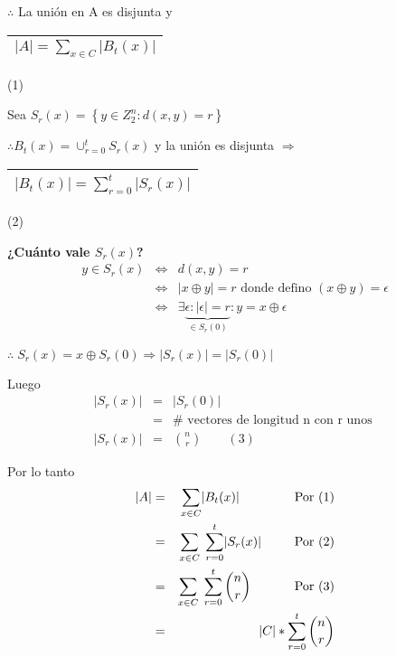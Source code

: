\documentclass[12pt,a4paper]{report}
\begin{document}
			\begin{center}
				$\therefore$ La unión en A es disjunta y \begin{tabular}{|c|} \hline $ \lvert A \rvert = \sum_{x \in C} \lvert B_{t}(x) \rvert $ \\ \hline \end{tabular} (1)
			\end{center}

			\vspace{3mm}
			\par Sea $S_{r}(x) = \left\lbrace y \in Z_{2}^{n} : d(x, y) = r \right\rbrace$

			\vspace{3mm}
			\par $\therefore B_{t}(x) = \cup_{r = 0}^{t}S_{r}(x)$ y la unión es disjunta $\Rightarrow$ \begin{tabular}{|c|} \hline $ \lvert B_{t}(x) \rvert = \sum_{r = 0}^{t}\lvert S_{r}(x) \rvert$ \\ \hline \end{tabular} (2)

			\vspace{3mm}
			\textbf{¿Cuánto vale $S_{r}(x)$?}
			\begin{eqnarray}
				\nonumber y \in S_{r}(x) & \Leftrightarrow & d(x, y) = r \\
				\nonumber & \Leftrightarrow & \lvert x \oplus y \rvert = r \text{ donde defino } (x \oplus y) = \epsilon \\
				\nonumber & \Leftrightarrow & \exists \underbrace{\epsilon : \lvert \epsilon\rvert = r}_{\in S_{r}(0)} : y = x \oplus \epsilon
			\end{eqnarray}
			\par $\therefore \; S_{r}(x) = x \oplus S_{r}(0) \Rightarrow \lvert S_{r}(x)\rvert = \lvert S_{r}(0)\rvert $

			\vspace{3mm}
			\par Luego
			\begin{eqnarray}
				\nonumber \lvert S_{r}(x)\rvert &=& \lvert S_{r}(0)\rvert \\
				\nonumber &=& \# \text{ vectores de longitud n con r unos } \\
				\nonumber \lvert S_{r}(x)\rvert &=& {n \choose r} \qquad (3)
			\end{eqnarray}

			\par Por lo tanto
			\begin{eqnarray}
				\nonumber \lvert A\rvert &=& \sum_{x \in C} \lvert B_{t}(x)\rvert \qquad \qquad \textup{ Por (1)} \\
				\nonumber &=& \sum_{x \in C} \; \sum_{r= 0}^{t} \lvert S_{r}(x) \rvert \; \qquad \textup{ Por (2)} \\
				\nonumber &=& \sum_{x \in C} \; \sum_{r = 0}^{t} {n \choose r} \qquad \; \; \; \;\textup{ Por (3)} \\
				\nonumber &=& \lvert C \rvert * \sum_{r = 0}^{t} {n \choose r}
			\end{eqnarray}
\end{document}

